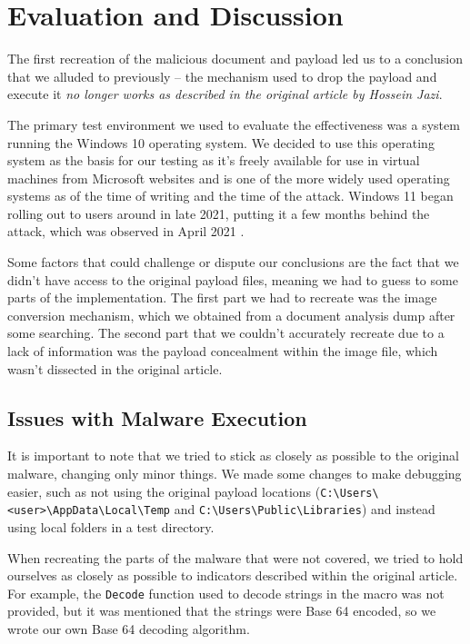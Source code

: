 \chapter{Evaluation and Discussion}
The first recreation of the malicious document and payload led us to a conclusion that we alluded to previously -- the
mechanism used to drop the payload and execute it \emph{no longer works as described in the original article by Hossein
Jazi}. 

The primary test environment we used to evaluate the effectiveness was a system running the Windows 10 operating system.
We decided to use this operating system as the basis for our testing as it's freely available for use in virtual
machines from Microsoft websites and is one of the more widely used operating systems as of the time of writing and the
time of the attack. Windows 11 began rolling out to users around in late 2021, putting it a few months behind the
attack, which was observed in April 2021 \cite{jazi-article, win11-rollout}. 

Some factors that could challenge or dispute our conclusions are the fact that we didn't have access to the original
payload files, meaning we had to guess to some parts of the implementation. The first part we had to recreate was the
image conversion mechanism, which we obtained from a document analysis dump after some searching. The second part that
we couldn't accurately recreate due to a lack of information was the payload concealment within the image file, which
wasn't dissected in the original article. 

\section{Issues with Malware Execution}
It is important to note that we tried to stick as closely as possible to the original malware, changing only minor
things. We made some changes to make debugging easier, such as not using the original payload locations
(\verb+C:\Users\<user>\AppData\Local\Temp+ and \verb+C:\Users\Public\Libraries+) and instead using local folders in a
test directory.

When recreating the parts of the malware that were not covered, we tried to hold ourselves as closely as possible to
indicators described within the original article. For example, the \verb+Decode+ function used to decode strings in
the macro was not provided, but it was mentioned that the strings were Base 64 encoded, so we wrote our own Base 64
decoding algorithm.

